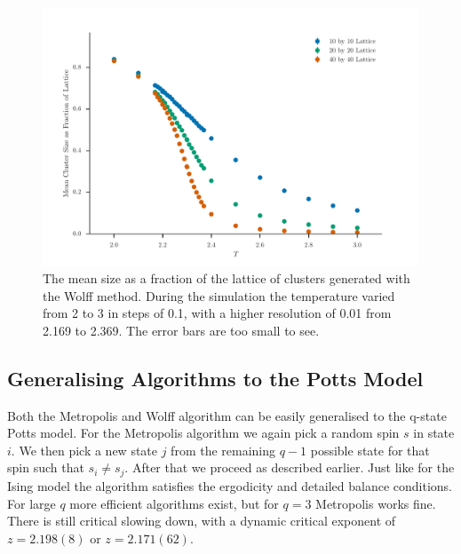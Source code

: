 \documentclass[11pt, a4paper]{report} %
\begin{document}
\begin{figure}[htb]\label{fig:wolff_cluster_size}
	\centering
	\includegraphics[width=\textwidth]{wolff_mean_cluster_size_as_fraction_of_lattice.pdf}
	\caption{The mean size as a fraction of the lattice of clusters generated with the Wolff method. During the simulation the temperature varied from 2 to 3 in steps of 0.1, with a higher resolution of 0.01 from 2.169 to 2.369. The error bars are too small to see.}
\end{figure}

\subsection{Generalising Algorithms to the Potts Model}
Both the Metropolis and Wolff algorithm can be easily generalised to the q-state Potts model.
For the Metropolis algorithm we again pick a random spin \(s\) in state \(i\).
We then pick a new state \(j\) from the remaining \(q-1\) possible state for that spin such that \(s_i \neq s_j\).
After that we proceed as described earlier.
Just like for the Ising model the algorithm satisfies the ergodicity and detailed balance conditions.
For large \(q\) more efficient algorithms exist, but for \(q=3\) Metropolis works fine.
There is still critical slowing down, with a dynamic critical exponent of \(z=2.198(8)\)\cite{newman:1999} or \(z=2.171(62)\).\cite{fan:2007}
\end{document}
